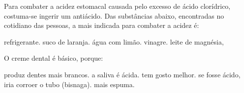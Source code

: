 \documentclass[11pt]{scrartcl}
\author{fabio}
\date{\today}
\title{}
\def\disciplina{Química}
\begin{document}





\begin{exercise}[points=1]
Para combater a acidez estomacal causada pelo excesso de ácido clorídrico, costuma-se ingerir um antiácido. Das substâncias abaixo, encontradas no cotidiano das pessoas, a mais indicada para combater a acidez é:

\begin{choice}
\choice refrigerante.
\choice suco de laranja.
\choice água com limão.
\choice vinagre.
\choice leite de magnésia, 
\end{choice}
\end{exercise}





\begin{exercise}[points=1]
O creme dental é básico, porque:

\begin{choice}
\choice produz dentes mais brancos.
\choice a saliva é ácida.
\choice tem gosto melhor.
\choice se fosse ácido, iria corroer o tubo (bisnaga).
\choice mais espuma.
\end{choice}
\end{exercise}
\end{document}
